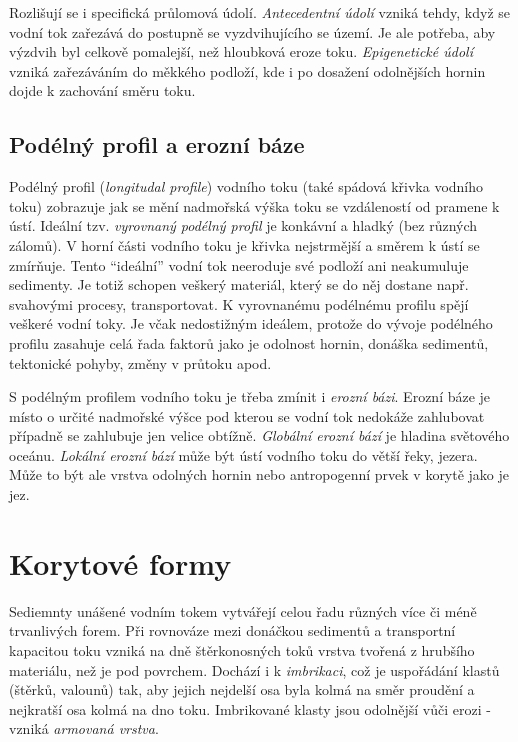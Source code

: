 Rozlišují se i specifická průlomová údolí. \emph{Antecedentní údolí} vzniká tehdy, když se vodní tok zařezává do postupně se vyzdvihujícího se území. Je ale potřeba, aby výzdvih byl celkově pomalejší, než hloubková eroze toku. \emph{Epigenetické údolí} vzniká zařezáváním do měkkého podloží, kde i po dosažení odolnějších hornin dojde k zachování směru toku. 


\subsection{Podélný profil a erozní báze}
Podélný profil (\textit{longitudal profile}) vodního toku (také spádová křivka vodního toku) zobrazuje jak se mění nadmořská výška toku se vzdáleností od pramene k ústí. Ideální tzv. \emph{vyrovnaný podélný profil} je konkávní a hladký (bez různých zálomů). V horní části vodního toku je křivka nejstrmější a směrem k ústí se zmírňuje. Tento \enquote{ideální} vodní tok neeroduje své podloží ani neakumuluje sedimenty. Je totiž schopen veškerý materiál, který se do něj dostane např. svahovými procesy, transportovat. K vyrovnanému podélnému profilu spějí veškeré vodní toky. Je včak nedostižným ideálem, protože do vývoje podélného profilu zasahuje celá řada faktorů jako je odolnost hornin, donáška sedimentů, tektonické pohyby, změny v průtoku apod. 

S podélným profilem vodního toku je třeba zmínit i \emph{erozní bázi}. Erozní báze je místo o určité nadmořské výšce pod kterou se vodní tok nedokáže zahlubovat případně se zahlubuje jen velice obtížně. \emph{Globální erozní bází} je hladina světového oceánu. \emph{Lokální erozní bází} může být ústí vodního toku do větší řeky, jezera. Může to být ale vrstva odolných hornin nebo antropogenní prvek v korytě jako je jez.





\section{Korytové formy}
Sediemnty unášené vodním tokem vytvářejí celou řadu různých více či méně trvanlivých forem. Při rovnováze mezi donáčkou sedimentů a transportní kapacitou toku vzniká na dně štěrkonosných toků vrstva tvořená z hrubšího materiálu, než je pod povrchem. Dochází i k \emph{imbrikaci}, což je uspořádání klastů (štěrků, valounů) tak, aby jejich nejdelší osa byla kolmá na směr proudění a nejkratší osa kolmá na dno toku. Imbrikované klasty jsou odolnější vůči erozi - vzniká \emph{armovaná vrstva}.

